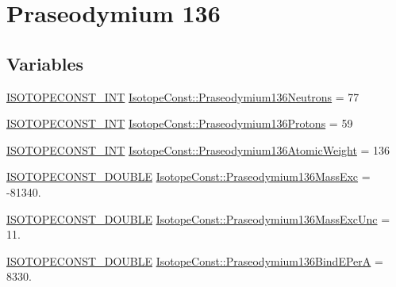 \hypertarget{group___isotope_const-_praseodymium-_pr136}{}\section{Praseodymium 136}
\label{group___isotope_const-_praseodymium-_pr136}
\subsection*{Variables}
\begin{DoxyCompactItemize}
\item 
\mbox{\hyperlink{group___isotope_const-_macros_ga5f18360b3e99483a35c32d789e62621c}{I\+S\+O\+T\+O\+P\+E\+C\+O\+N\+S\+T\+\_\+\+I\+NT}} \mbox{\hyperlink{group___isotope_const-_praseodymium-_pr136_ga32acbe3f5e021b50fda982e71c412209}{Isotope\+Const\+::\+Praseodymium136\+Neutrons}} = 77
\item 
\mbox{\hyperlink{group___isotope_const-_macros_ga5f18360b3e99483a35c32d789e62621c}{I\+S\+O\+T\+O\+P\+E\+C\+O\+N\+S\+T\+\_\+\+I\+NT}} \mbox{\hyperlink{group___isotope_const-_praseodymium-_pr136_gaa5155ac8ea6a96d808312062d557c855}{Isotope\+Const\+::\+Praseodymium136\+Protons}} = 59
\item 
\mbox{\hyperlink{group___isotope_const-_macros_ga5f18360b3e99483a35c32d789e62621c}{I\+S\+O\+T\+O\+P\+E\+C\+O\+N\+S\+T\+\_\+\+I\+NT}} \mbox{\hyperlink{group___isotope_const-_praseodymium-_pr136_ga14a6c5d4efa60b7a2025fa641602c772}{Isotope\+Const\+::\+Praseodymium136\+Atomic\+Weight}} = 136
\item 
\mbox{\hyperlink{group___isotope_const-_macros_ga8f45a7272ce02c0b4c65c44636ed719a}{I\+S\+O\+T\+O\+P\+E\+C\+O\+N\+S\+T\+\_\+\+D\+O\+U\+B\+LE}} \mbox{\hyperlink{group___isotope_const-_praseodymium-_pr136_ga18effc1c3876ca80714a34faef248aad}{Isotope\+Const\+::\+Praseodymium136\+Mass\+Exc}} = -\/81340.
\item 
\mbox{\hyperlink{group___isotope_const-_macros_ga8f45a7272ce02c0b4c65c44636ed719a}{I\+S\+O\+T\+O\+P\+E\+C\+O\+N\+S\+T\+\_\+\+D\+O\+U\+B\+LE}} \mbox{\hyperlink{group___isotope_const-_praseodymium-_pr136_gaf9e443998427f3defad36c28fc268503}{Isotope\+Const\+::\+Praseodymium136\+Mass\+Exc\+Unc}} = 11.
\item 
\mbox{\hyperlink{group___isotope_const-_macros_ga8f45a7272ce02c0b4c65c44636ed719a}{I\+S\+O\+T\+O\+P\+E\+C\+O\+N\+S\+T\+\_\+\+D\+O\+U\+B\+LE}} \mbox{\hyperlink{group___isotope_const-_praseodymium-_pr136_ga8f1c39bd330da78bb73bd01d20593700}{Isotope\+Const\+::\+Praseodymium136\+Bind\+E\+PerA}} = 8330.

\end{DoxyCompactItemize}
